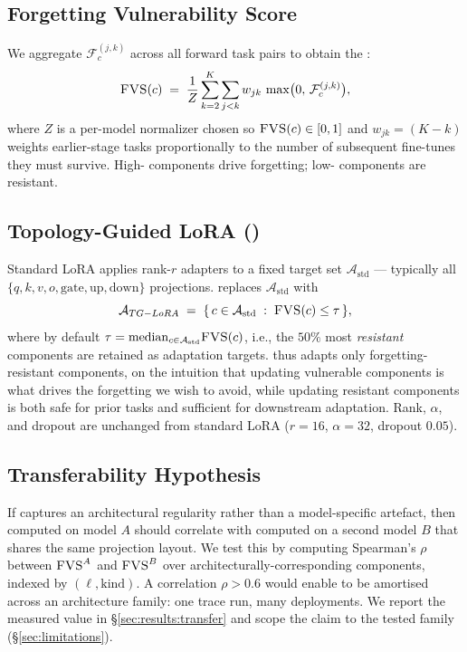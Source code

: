 \subsection{Forgetting Vulnerability Score}
\label{sec:method:fvs}

We aggregate $\mathcal{F}_c^{(j,k)}$ across all forward task pairs to obtain the \fvs{}:
\begin{equation}
\label{eq:FVS}
\textsc{FVS}(c) \;=\; \frac{1}{Z} \sum_{k=2}^{K} \sum_{j<k} w_{jk} \, \max\!\big(0,\, \mathcal{F}_c^{(j,k)}\big),
\end{equation}
where $Z$ is a per-model normalizer chosen so $\textsc{FVS}(c) \in [0,1]$ and $w_{jk} = (K - k)$ weights earlier-stage tasks proportionally to the number of subsequent fine-tunes they must survive. High-\fvs{} components drive forgetting; low-\fvs{} components are resistant.

\subsection{Topology-Guided LoRA (\tglora{})}
\label{sec:method:tglora}

Standard LoRA applies rank-$r$ adapters to a fixed target set $\mathcal{A}_{\mathrm{std}}$ --- typically all $\{q, k, v, o, \mathrm{gate}, \mathrm{up}, \mathrm{down}\}$ projections. \tglora{} replaces $\mathcal{A}_{\mathrm{std}}$ with
\begin{equation}
\mathcal{A}_{TG-LoRA{}} \;=\; \{\, c \in \mathcal{A}_{\mathrm{std}} \;:\; \textsc{FVS}(c) \le \tau \,\},
\end{equation}
where by default $\tau = \mathrm{median}_{c \in \mathcal{A}_{\mathrm{std}}} \textsc{FVS}(c)$, i.e., the $50\%$ most \textit{resistant} components are retained as adaptation targets. \tglora{} thus adapts only forgetting-resistant components, on the intuition that updating vulnerable components is what drives the forgetting we wish to avoid, while updating resistant components is both safe for prior tasks and sufficient for downstream adaptation. Rank, $\alpha$, and dropout are unchanged from standard LoRA ($r{=}16$, $\alpha{=}32$, dropout $0.05$).

\subsection{Transferability Hypothesis}
\label{sec:method:transfer}

If \fvs{} captures an architectural regularity rather than a model-specific artefact, then \fvs{} computed on model $A$ should correlate with \fvs{} computed on a second model $B$ that shares the same projection layout. We test this by computing Spearman's $\rho$ between $\textsc{FVS}^{A}$ and $\textsc{FVS}^{B}$ over architecturally-corresponding components, indexed by $(\ell, \mathrm{kind})$. A correlation $\rho > 0.6$ would enable \fvs{} to be amortised across an architecture family: one trace run, many deployments. We report the measured value in \S\ref{sec:results:transfer} and scope the claim to the tested family (\S\ref{sec:limitations}).
